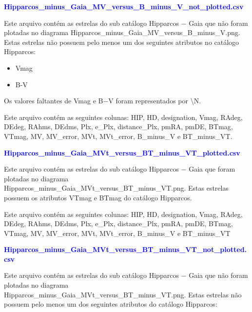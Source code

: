 \documentclass{article}
\begin{document}
	\vspace{10pt}
		
	\textcolor{blue}{\textbf{Hipparcos\_minus\_Gaia\_MV\_versus\_B\_minus\_V\_not\_plotted.csv}}	
	
	\vspace{10pt}
		
	Este arquivo contém as estrelas do sub catálogo Hipparcos $-$ Gaia que não foram plotadas no diagrama Hipparcos\_minus\_Gaia\_MV\_versus\_B\_minus\_V.png.
	Estas estrelas não possuem pelo menos um dos seguintes atributos no catálogo Hipparcos: 
	
	\begin{itemize}
		\item Vmag
		\item B-V
	\end{itemize}

	Os valores faltantes de Vmag e B$-$V foram representados por \textbackslash N.
	
	Este arquivo contém as seguintes colunas:
	HIP, HD, designation, Vmag, RAdeg, DEdeg, RAhms, DEdms, Plx, e\_Plx, distance\_Plx, pmRA, pmDE, BTmag, VTmag, MV, MV\_error, MVt, MVt\_error, B\_minus\_V e BT\_minus\_VT.
	
	\vspace{10pt}
		
	\textcolor{blue}{\textbf{Hipparcos\_minus\_Gaia\_MVt\_versus\_BT\_minus\_VT\_plotted.csv}}
	
	\vspace{10pt}

	Este arquivo contém as estrelas do sub catálogo Hipparcos $-$ Gaia que foram plotadas no diagrama Hipparcos\_minus\_Gaia\_MVt\_versus\_BT\_minus\_VT.png.
	Estas estrelas possuem os atributos VTmag e BTmag do catálogo Hipparcos.
	
	Este arquivo contém as seguintes colunas:
	HIP, HD, designation, Vmag, RAdeg, DEdeg, RAhms, DEdms, Plx, e\_Plx, distance\_Plx, pmRA, pmDE, BTmag, VTmag, MV, MV\_error, MVt, MVt\_error, B\_minus\_V e BT\_minus\_VT
	
	\newpage
	
	\textcolor{blue}{\textbf{Hipparcos\_minus\_Gaia\_MVt\_versus\_BT\_minus\_VT\_not\_plotted.csv}}
	
	\vspace{10pt}
	
	Este arquivo contém as estrelas do sub catálogo Hipparcos $-$ Gaia que não foram plotadas no diagrama Hipparcos\_minus\_Gaia\_MVt\_versus\_BT\_minus\_VT.png.
	Estas estrelas não possuem pelo menos um dos seguintes atributos do catálogo Hipparcos: 
	
\end{document}
